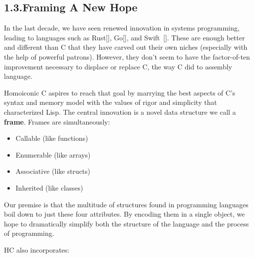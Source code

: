 \documentclass[preprint]{{sigplanconf}}
\begin{document}
\subsection{1.3.\hspace*{0.5em}Framing A New Hope}\label{sec-frames}%

\noindent{}In the last decade, we have seen renewed innovation in systems
programming, leading to languages such as Rust[], Go[], and
Swift~{}[]. These are enough better and different than C that they
have carved out their own niches (especially with the help of powerful
patrons). However, they don't seem to have the factor-of-ten improvement
necessary to displace or replace C, the way C did to assembly language.%

Homoiconic C aspires to reach that goal by marrying the best aspects of
C's syntax and memory model with the values of rigor and simplicity that
characterized Lisp. The central innovation is a novel data structure we
call a \textbf{frame}. Frames are simultaneously:%

\begin{itemize}[noitemsep,topsep=\mdcompacttopsep]%

\item{}Callable (like functions)%

\item{}Enumerable (like arrays)%

\item{}Associative (like structs)%

\item{}Inherited (like classes)%
\end{itemize}%

\noindent{}Our premise is that the multitude of structures found in programming
languages boil down to just these four attributes. By encoding
them in a single object, we hope to dramatically simplify both the structure
of the language and the process of programming.%

HC also incorporates:%
\end{document}
